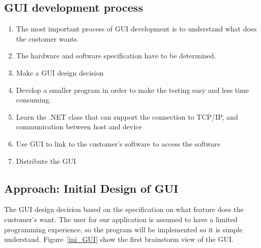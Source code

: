 \documentclass[oneside]{ecsgdp}         %
\begin{document}
\subsection{GUI development process} 
\flushleft
\begin{enumerate}


\item	The most important process of GUI development is to understand what does the customer wants. 

\item	The hardware and software specification have to be determined.
 
\item	Make a GUI design decision

\item Develop a smaller program in order to make the testing easy and less time consuming. 

\item	Learn the .NET class that can support the connection to TCP/IP, and communication between host and device

\item	Use GUI to link to the customer’s software to access the software

\item	Distribute the GUI
\end{enumerate}

\subsection{Approach: Initial Design of GUI}
The GUI design decision based on the specification on what feature does the customer’s want. The user for our application is assumed to have a limited programming experience, so the program will be implemented so it is simple understand. Figure~\ref{ini_GUI} show the first brainstorm view of the GUI. 
\end{document}
